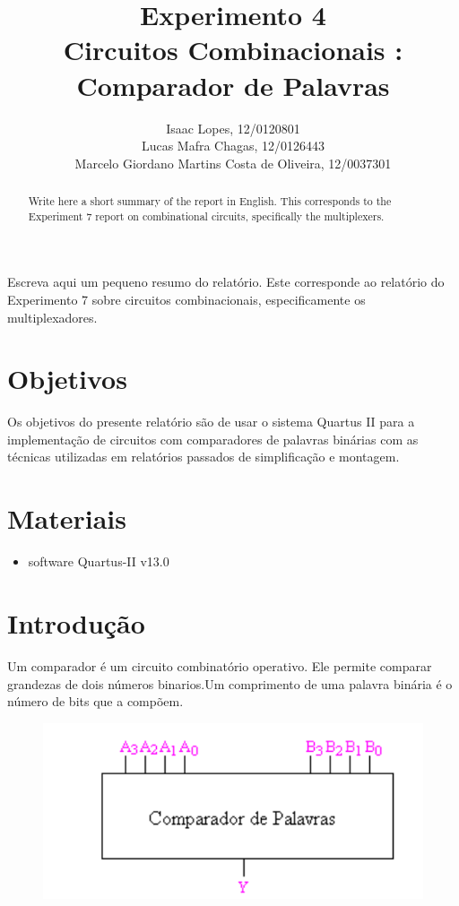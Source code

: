 \documentclass[12pt]{article}
\title{Experimento 4\\
	Circuitos Combinacionais : Comparador de Palavras }
\author{Isaac Lopes, 12/0120801\\
	Lucas Mafra Chagas, 12/0126443 \\
	Marcelo Giordano Martins Costa de Oliveira,  12/0037301
}
\begin{document}
 

\maketitle

 \begin{abstract}
   Write here a short summary of the report in English. This corresponds to the Experiment 7 report on combinational circuits, specifically the multiplexers.
 \end{abstract}
     
 \begin{resumo} 
  Escreva aqui um pequeno resumo do relatório. Este corresponde ao relatório do Experimento 7 sobre circuitos combinacionais, especificamente os multiplexadores.
 \end{resumo}


\section{Objetivos}
\label{sec:Objetivos}

Os objetivos do presente relatório são de usar o sistema Quartus II para a implementação de circuitos com comparadores de palavras binárias com as técnicas utilizadas em relatórios passados de simplificação e montagem.

\section{Materiais} 
\label{sec:Materiais}

\begin{itemize}
    \item software Quartus-II v13.0
\end{itemize}
\section{Introdução}
\label{sec:Introducao}

Um comparador é um circuito combinatório operativo. Ele permite comparar grandezas de dois números binarios.Um comprimento de uma palavra binária é o número de bits que a compõem.
\begin{figure}[H]
	\centering
	\includegraphics[width=.5\textwidth]{cc1.png}	
\end{figure}
\end{document}
